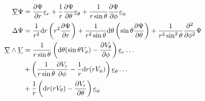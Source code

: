 \begin{align*}
\grad \Psi &= \dr{r}{\Psi} \v e_r + \frac{1}{r}\dr{\theta}{\Psi}\v e_\theta + \frac{1}{r\sin\theta}\dr{\phi}{\Psi} \v e_\phi\\
 \Delta \Psi & = \frac{1}{r^2}\dd{r}\left(r^2\dr{r}{\Psi}\right) 
+ \frac{1}{r^2\sin\theta}\dd{\theta}\left(\sin\theta\dr{\theta}{\Psi}\right)
+ \frac{1}{r^2\sin^2\theta}\frac{\d^2}{\d\phi^2}\Psi \\
\rot \v V &= \frac{1}{r\sin\theta}\left(\dd{\theta}(\sin\theta V_\phi)-\dr{\phi}{V_\theta}\right)\v e_r \dots\\
&+ \left(\frac{1}{r\sin\theta}\dr{\phi}{V_r} - \frac{1}{r}\dd{r}(rV_\phi)\right) \v e_\theta \dots \\
&+ \frac{1}{r}\left( \dd{r}(rV_\theta) - \dr{\theta}{V_r}\right)\v e_\phi
\end{align*}


